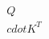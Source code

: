 \documentclass[preview]{standalone}
\begin{document}
\begin{align*}
Q \\cdot K^T
\end{align*}
\end{document}
